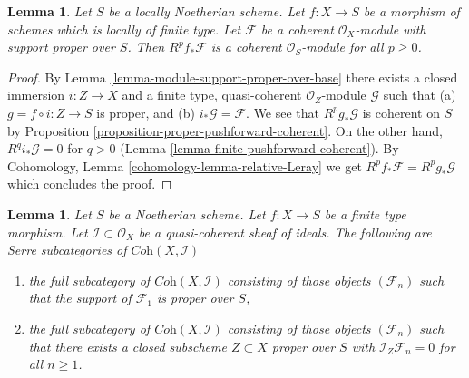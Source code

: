 \documentclass{stacks-project}
\theoremstyle{plain}
\newtheorem{lemma}[subsection]{Lemma}
\theoremstyle{definition}
\theoremstyle{remark}
\numberwithin{equation}{subsection}
\begin{document}
\begin{lemma}
\label{lemma-support-proper-over-base-pushforward}
Let $S$ be a locally Noetherian scheme.
Let $f : X \to S$ be a morphism of schemes which is locally of finite type.
Let $\mathcal{F}$ be a coherent $\mathcal{O}_X$-module
with support proper over $S$. Then $R^pf_*\mathcal{F}$
is a coherent $\mathcal{O}_S$-module for all $p \geq 0$.
\end{lemma}

\begin{proof}
By Lemma \ref{lemma-module-support-proper-over-base}
there exists a closed immersion $i : Z \to X$ and
a finite type, quasi-coherent $\mathcal{O}_Z$-module
$\mathcal{G}$ such that (a) $g = f \circ i : Z \to S$ is proper, and (b)
$i_*\mathcal{G} = \mathcal{F}$.
We see that $R^pg_*\mathcal{G}$ is coherent on $S$ by
Proposition \ref{proposition-proper-pushforward-coherent}.
On the other hand, $R^qi_*\mathcal{G} = 0$ for $q > 0$
(Lemma \ref{lemma-finite-pushforward-coherent}).
By Cohomology, Lemma \ref{cohomology-lemma-relative-Leray}
we get $R^pf_*\mathcal{F} = R^pg_*\mathcal{G}$ which concludes the proof.
\end{proof}

\begin{lemma}
\label{lemma-systems-with-proper-support}
Let $S$ be a Noetherian scheme. Let $f : X \to S$ be a finite type morphism.
Let $\mathcal{I} \subset \mathcal{O}_X$ be
a quasi-coherent sheaf of ideals. The following are Serre subcategories
of $\textit{Coh}(X, \mathcal{I})$
\begin{enumerate}
\item the full subcategory of $\textit{Coh}(X, \mathcal{I})$
consisting of those objects $(\mathcal{F}_n)$ such that
the support of $\mathcal{F}_1$ is proper over $S$,
\item the full subcategory of $\textit{Coh}(X, \mathcal{I})$
consisting of those objects $(\mathcal{F}_n)$ such that
there exists a closed subscheme $Z \subset X$ proper over $S$
with $\mathcal{I}_Z \mathcal{F}_n = 0$ for all $n \geq 1$.
\end{enumerate}
\end{lemma}
\end{document}
